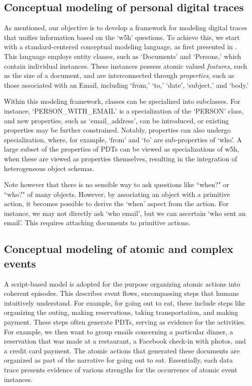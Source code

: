 \documentclass[11pt]{article}
\begin{document}
\subsection{Conceptual modeling of personal digital traces}
As mentioned, our objective is to develop a framework for modeling digital traces that unifies information based on the `w5h' questions. To achieve this, we start with a standard-centered conceptual modeling language, as first presented in \cite{usOdbase}. This language employs entity classes, such as `Documents' and `Persons,' which contain individual instances. These instances possess atomic valued {\em features}, such as the size of a document, and are interconnected through {\em properties}, such as those associated with an Email, including `from,' `to,' `date', `subject,' and `body.'

Within this modeling framework, classes can be specialized  into subclasses. For instance, `PERSON\_WITH\_EMAIL' is a specialization of the `PERSON' class, and new properties, such as `email\_address', can be introduced, or existing properties may be further constrained.%
Notably, properties can also undergo specialization, where, for example, `from' and `to' are sub-properties of `who'. A large subset of the properties of PDTs can be viewed as specializations of w5h, when these are viewed as properties themselves, resulting in the integration of heterogeneous object schemas. 

Note however that there is no sensible way to ask questions like ``when?" or ``who?" of many objects.  However, by associating an object with a primitive action, it becomes possible to derive the `when' aspect from the action. For instance, we may not directly ask `who email', but we can ascertain `who sent an email'. This requires attaching documents to primitive actions.%

\subsection{Conceptual modeling of atomic and complex events}

A script-based model is adopted for the purpose organizing atomic actions into coherent episodes. This describes event flows, encompassing steps that humans intuitively understand. For example, for going out to eat, these include steps like organizing the outing, making reservations, taking transportation, and making payment. These steps often generate PDTs, serving as evidence for the activities. 
For example, we then want to group emails concerning a particular dinner, a reservation that was made at a restaurant, a Facebook check-in with photos, and a credit card payment. The atomic actions  that generated these documents are organized
 as part of the narrative for going out to eat.  Essentially, each data trace presents evidence of various strengths for the occurrence of atomic event instances.
\end{document}
